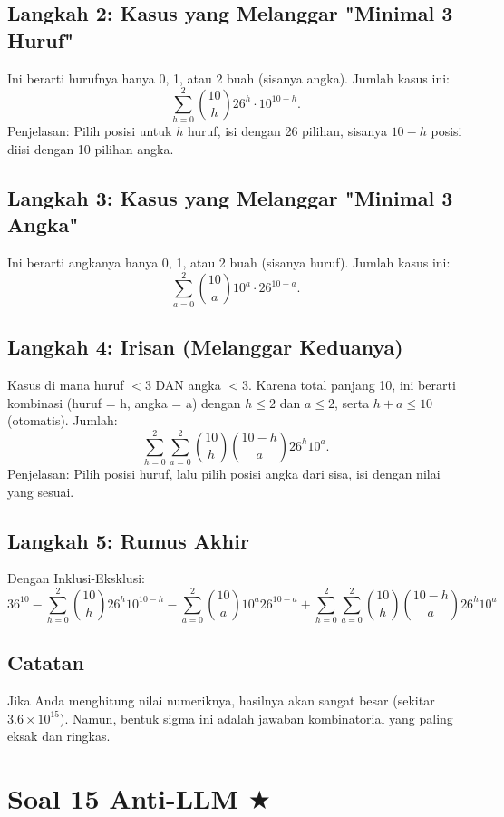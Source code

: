 \documentclass[12pt,a4paper]{article}
\begin{document}
\subsection*{Langkah 2: Kasus yang Melanggar "Minimal 3 Huruf"}
Ini berarti hurufnya hanya 0, 1, atau 2 buah (sisanya angka).
Jumlah kasus ini:
\[
\sum_{h=0}^{2} \binom{10}{h} 26^h \cdot 10^{10-h}.
\]
Penjelasan: Pilih posisi untuk $h$ huruf, isi dengan 26 pilihan, sisanya $10-h$ posisi diisi dengan 10 pilihan angka.

\subsection*{Langkah 3: Kasus yang Melanggar "Minimal 3 Angka"}
Ini berarti angkanya hanya 0, 1, atau 2 buah (sisanya huruf).
Jumlah kasus ini:
\[
\sum_{a=0}^{2} \binom{10}{a} 10^a \cdot 26^{10-a}.
\]

\subsection*{Langkah 4: Irisan (Melanggar Keduanya)}
Kasus di mana huruf $< 3$ DAN angka $< 3$. Karena total panjang 10, ini berarti kombinasi (huruf = h, angka = a) dengan $h \le 2$ dan $a \le 2$, serta $h+a \le 10$ (otomatis).
Jumlah:
\[
\sum_{h=0}^{2} \sum_{a=0}^{2} \binom{10}{h} \binom{10-h}{a} 26^h 10^a.
\]
Penjelasan: Pilih posisi huruf, lalu pilih posisi angka dari sisa, isi dengan nilai yang sesuai.

\subsection*{Langkah 5: Rumus Akhir}
Dengan Inklusi-Eksklusi:
\[
\boxed{
36^{10} - \sum_{h=0}^{2} \binom{10}{h}26^h10^{10-h}
- \sum_{a=0}^{2} \binom{10}{a}10^a26^{10-a}
+ \sum_{h=0}^{2}\sum_{a=0}^{2} \binom{10}{h}\binom{10-h}{a}26^h10^a
}
\]

\subsection*{Catatan}
Jika Anda menghitung nilai numeriknya, hasilnya akan sangat besar (sekitar $3.6 \times 10^{15}$). Namun, bentuk sigma ini adalah jawaban kombinatorial yang paling eksak dan ringkas. 

\newpage
\section*{Soal 15 Anti-LLM $\boldsymbol{\bigstar}$}
\end{document}
